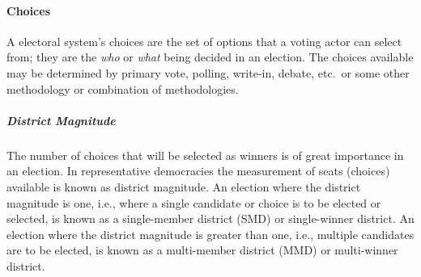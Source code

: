\paragraph{Choices}
A electoral system's choices are the set of options that a voting actor can
select from; they are the \emph{who} or \emph{what} being decided in an
election. The choices available may be determined by primary vote, polling,
write-in, debate, etc.\ or some other methodology or combination of
methodologies.

\subparagraph{District Magnitude}
The number of choices that will be selected as winners is of great importance in
an election. In representative democracies the measurement of seats (choices)
available is known as district magnitude. An election where the district
magnitude is one, i.e., where a single candidate or choice is to be elected or
selected, is known as a single-member district (SMD) or single-winner district.
An election where the district magnitude is greater than one, i.e., multiple
candidates are to be elected, is known as a multi-member district (MMD) or
multi-winner district.%


